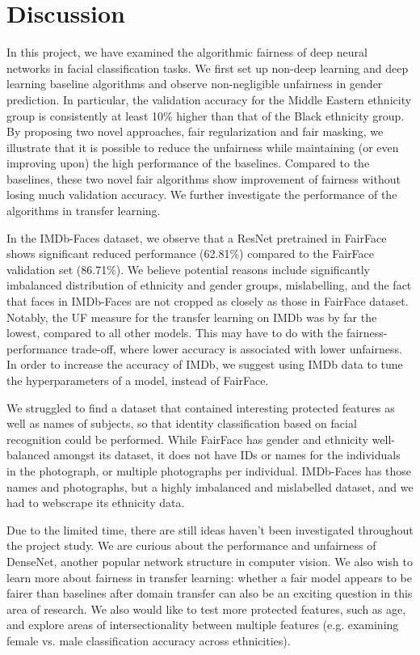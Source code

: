 \section{Discussion}

In this project, we have examined the algorithmic fairness of deep neural networks in facial classification tasks. We first set up non-deep learning and deep learning baseline algorithms and observe non-negligible unfairness in gender prediction. In particular, the validation accuracy for the Middle Eastern ethnicity group is consistently at least 10$\%$ higher than that of the Black ethnicity group. By proposing two novel approaches, fair regularization and fair masking, we illustrate that it is possible to reduce the unfairness while maintaining (or even improving upon) the high performance of the baselines. Compared to the baselines, these two novel fair algorithms show improvement of fairness without losing much validation accuracy. We further investigate the performance of the algorithms in transfer learning.

In the IMDb-Faces dataset, we observe that a ResNet pretrained in FairFace shows significant reduced performance (62.81\%) compared to the FairFace validation set (86.71\%). We believe potential reasons include significantly imbalanced distribution of ethnicity and gender groups, mislabelling, and the fact that faces in IMDb-Faces are not cropped as closely as those in FairFace dataset. Notably, the UF measure for the transfer learning on IMDb was by far the lowest, compared to all other models. This may have to do with the fairness-performance trade-off, where lower accuracy is associated with lower unfairness. In order to increase the accuracy of IMDb, we suggest using IMDb data to tune the hyperparameters of a model, instead of FairFace.

We struggled to find a dataset that contained interesting protected features as well as names of subjects, so that identity classification based on facial recognition could be performed. While FairFace has gender and ethnicity well-balanced amongst its dataset, it does not have IDs or names for the individuals in the photograph, or multiple photographs per individual. IMDb-Faces has those names and photographs, but a highly imbalanced and mislabelled dataset, and we had to webscrape its ethnicity data.

Due to the limited time, there are still ideas haven't been investigated throughout the project study. We are curious about the performance and unfairness of DenseNet, another popular network structure in computer vision. We also wish to learn more about fairness in transfer learning: whether a fair model appears to be fairer than baselines after domain transfer can also be an exciting question in this area of research. We also would like to test more protected features, such as age, and explore areas of intersectionality between multiple features (e.g. examining female vs. male classification accuracy across ethnicities).

